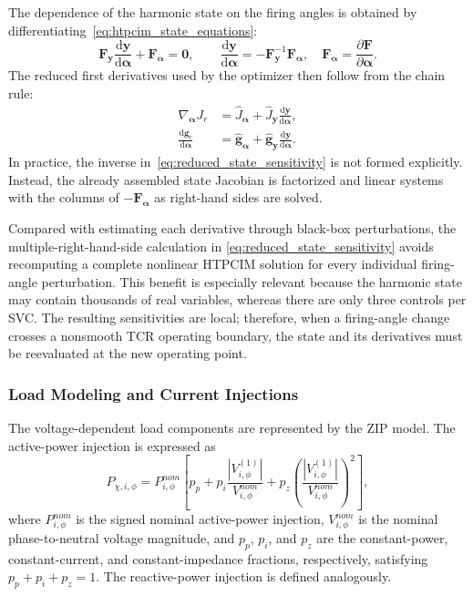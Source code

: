 \documentclass[journal]{IEEEtran}
\begin{document}
The dependence of the harmonic state on the firing angles is obtained by
differentiating~\eqref{eq:htpcim_state_equations}:
\begin{equation}
    \bm{F}_{\bm{y}}
    \frac{\mathrm{d}\bm{y}}{\mathrm{d}\bm{\alpha}}
    +\bm{F}_{\bm{\alpha}}=\bm{0},
    \qquad
    \frac{\mathrm{d}\bm{y}}{\mathrm{d}\bm{\alpha}}
    =-\bm{F}_{\bm{y}}^{-1}\bm{F}_{\bm{\alpha}},
    \quad
    \bm{F}_{\bm{\alpha}}
    =\frac{\partial\bm{F}}{\partial\bm{\alpha}}.
    \label{eq:reduced_state_sensitivity}
\end{equation}
The reduced first derivatives used by the optimizer then follow from the
chain rule:
\begin{align}
    \nabla_{\bm{\alpha}}J_r
    &=\widehat{J}_{\bm{\alpha}}
      +\widehat{J}_{\bm{y}}
       \frac{\mathrm{d}\bm{y}}{\mathrm{d}\bm{\alpha}},
       \label{eq:reduced_objective_gradient}\\
    \frac{\mathrm{d}\bm{g}_r}{\mathrm{d}\bm{\alpha}}
    &=\widehat{\bm{g}}_{\bm{\alpha}}
      +\widehat{\bm{g}}_{\bm{y}}
       \frac{\mathrm{d}\bm{y}}{\mathrm{d}\bm{\alpha}}.
       \label{eq:reduced_constraint_gradient}
\end{align}
In practice, the inverse in~\eqref{eq:reduced_state_sensitivity} is not
formed explicitly. Instead, the already assembled state Jacobian is
factorized and linear systems with the columns of
$-\bm{F}_{\bm{\alpha}}$ as right-hand sides are solved.

Compared with estimating each derivative through black-box perturbations,
the multiple-right-hand-side calculation in
\eqref{eq:reduced_state_sensitivity} avoids recomputing a complete nonlinear
HTPCIM solution for every individual firing-angle perturbation. This benefit
is especially relevant because the harmonic state may contain thousands of
real variables, whereas there are only three controls per SVC. The resulting
sensitivities are local; therefore, when a firing-angle change crosses a
nonsmooth TCR operating boundary, the state and its derivatives must be
reevaluated at the new operating point.

\subsubsection{Load Modeling and Current Injections}

The voltage-dependent load components are represented by the ZIP
model. The active-power injection is expressed as
\begin{equation}
P_{\chi,i,\phi}
=P_{i,\phi}^{nom}\left[
p_p+p_i\frac{|V_{i,\phi}^{(1)}|}{V_{i,\phi}^{nom}}
+p_z\left(\frac{|V_{i,\phi}^{(1)}|}{V_{i,\phi}^{nom}}\right)^2
\right],
\label{eq:zip_model}
\end{equation}
where $P_{i,\phi}^{nom}$ is the signed nominal active-power injection,
$V_{i,\phi}^{nom}$ is the nominal phase-to-neutral voltage magnitude,
and $p_p$, $p_i$, and $p_z$ are the constant-power,
constant-current, and constant-impedance fractions, respectively,
satisfying $p_p+p_i+p_z=1$. The reactive-power injection is defined
analogously.
\end{document}
